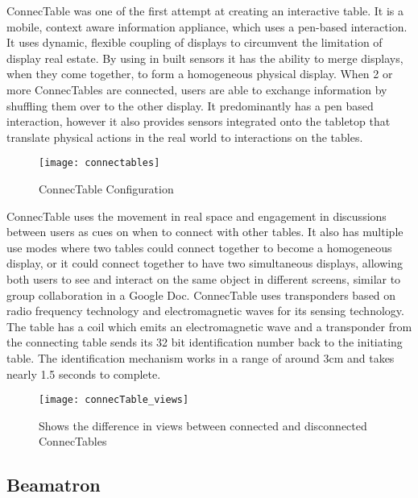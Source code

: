 ConnecTable\cite{connectables} was one of the first attempt at creating
an interactive table. It is a mobile, context aware
information appliance, which uses a pen-based interaction. It uses
dynamic, flexible coupling of displays to circumvent the limitation
of display real estate. By using in built sensors it has the ability
to merge displays, when they come together, to form a homogeneous physical
display. When 2 or more ConnecTables are connected, users are able
to exchange information by shuffling them over to the other display.
It predominantly has a pen based interaction, however it also provides sensors
integrated onto the tabletop that translate physical actions in the
real world to interactions on the tables. 
\begin{figure}[H]
\centering
\texttt{[image: connectables]}

\protect\caption{ConnecTable Configuration}
\end{figure}
ConnecTable uses the movement in real space and engagement in discussions
between users as cues on when to connect with other tables. It also
has multiple use modes where two tables could connect together to
become a homogeneous display, or it could connect together to have
two simultaneous displays, allowing both users to see and interact on
the same object in different screens, similar to group collaboration
in a Google Doc. ConnecTable uses transponders based on radio frequency
technology and electromagnetic waves for its sensing technology. The
table has a coil which emits an electromagnetic wave and a transponder
from the connecting table sends its 32 bit identification number
back to the initiating table. The identification mechanism works in
a range of around 3cm and takes nearly 1.5 seconds to complete.


\begin{figure}[h]
\centering
\texttt{[image: connecTable\_views]}
\protect\caption{Shows the difference in views between connected and disconnected ConnecTables}
\end{figure}

\subsection{Beamatron} \label{beamatron}

